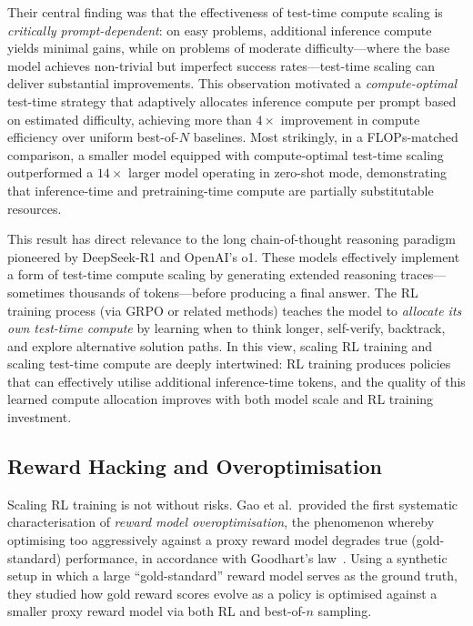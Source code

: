 Their central finding was that the effectiveness of test-time compute scaling
is \emph{critically prompt-dependent}: on easy problems, additional inference
compute yields minimal gains, while on problems of moderate difficulty---where
the base model achieves non-trivial but imperfect success rates---test-time
scaling can deliver substantial improvements.  This observation motivated a
\emph{compute-optimal} test-time strategy that adaptively allocates inference
compute per prompt based on estimated difficulty, achieving more than $4\times$
improvement in compute efficiency over uniform best-of-$N$ baselines.  Most
strikingly, in a FLOPs-matched comparison, a smaller model equipped with
compute-optimal test-time scaling outperformed a $14\times$ larger model
operating in zero-shot mode, demonstrating that inference-time and
pretraining-time compute are partially substitutable resources.

This result has direct relevance to the long chain-of-thought reasoning
paradigm pioneered by DeepSeek-R1 and OpenAI's o1.  These models effectively
implement a form of test-time compute scaling by generating extended reasoning
traces---sometimes thousands of tokens---before producing a final answer.  The
RL training process (via GRPO or related methods) teaches the model to
\emph{allocate its own test-time compute} by learning when to think longer,
self-verify, backtrack, and explore alternative solution paths.  In this view,
scaling RL training and scaling test-time compute are deeply intertwined: RL
training produces policies that can effectively utilise additional inference-time
tokens, and the quality of this learned compute allocation improves with both
model scale and RL training investment.

\subsection{Reward Hacking and Overoptimisation}

Scaling RL training is not without risks.  Gao et al.\ provided the first
systematic characterisation of \emph{reward model overoptimisation}, the
phenomenon whereby optimising too aggressively against a proxy reward model
degrades true (gold-standard) performance, in accordance with Goodhart's
law~\cite{gao2023scaling}.  Using a synthetic setup in which a large
``gold-standard'' reward model serves as the ground truth, they studied how gold
reward scores evolve as a policy is optimised against a smaller proxy reward
model via both RL and best-of-$n$ sampling.

